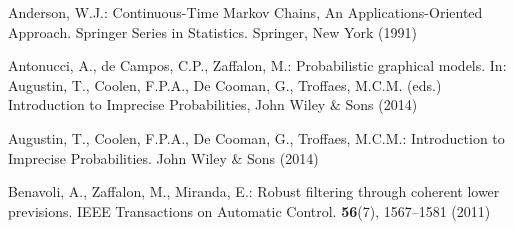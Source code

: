 
% 
%
%
% 
% 
%
\biblstarthook{}

\begin{thebibliography}{99.}%
%
%
%
%
%
%
%



Anderson, W.J.: Continuous-Time Markov Chains, An Applications-Oriented Approach. Springer Series in Statistics. Springer, New York (1991)

Antonucci, A., de Campos, C.P., Zaffalon, M.: {Probabilistic graphical models}. In: Augustin, T., Coolen, F.P.A., De Cooman, G., Troffaes, M.C.M. (eds.) Introduction to Imprecise Probabilities, {John Wiley \& Sons} (2014) 

Augustin, T., Coolen, F.P.A., De Cooman, G., Troffaes, M.C.M.: {Introduction to Imprecise Probabilities}. John Wiley \& Sons (2014) 


Benavoli, A., Zaffalon, M., Miranda, E.: {Robust filtering through coherent lower previsions}. IEEE Transactions on Automatic Control. \textbf{56}(7), 1567--1581 (2011)



\end{thebibliography}
